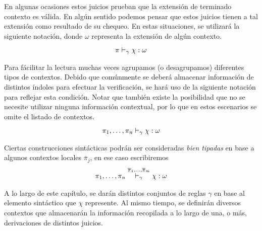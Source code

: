 En algunas ocasiones estos juicios prueban que la extensión de terminado contexto es válida. En algún sentido podemos pensar que estos juicios tienen a tal extensión como resultado de su chequeo.
En estas situaciones, se utilizará la siguiente notación, donde $\omega$ representa la extensión de algún contexto.
\begin{gather*}
\pi \DASH{\gamma} \chi : \omega
\end{gather*}

Para fácilitar la lectura muchas veces agrupamos (o desagrupamos) diferentes tipos de contextos.
Debido que comúnmente se deberá almacenar información de distintos índoles para efectuar la verificación, se hará uso de la siguiente notación para reflejar esta condición.
Notar que también existe la posibilidad que no se necesite utilizar ninguna información contextual, por lo que en estos escenarios se omite el listado de contextos.
\begin{gather*}
\pi_1, \ldots, \pi_n \DASH{\gamma} \chi : \omega
\end{gather*}

Ciertas construcciones sintácticas podrán ser consideradas \textit{bien tipadas} en base a algunos contextos locales $\overline{\pi}_{j}$, en ese caso escribiremos
\begin{gather*}
\pi_1, \ldots, \pi_n \DASH[\overline{\pi}_{1}, \ldots, \overline{\pi}_{m}]{\gamma} \chi : \omega
\end{gather*}

A lo largo de este capítulo, se darán distintos conjuntos de reglas $\gamma$ en base al elemento sintáctico que $\chi$ represente.
Al mismo tiempo, se definirán diversos contextos que almacenarán la información recopilada a lo largo de una, o más, derivaciones de distintos juicios.%

